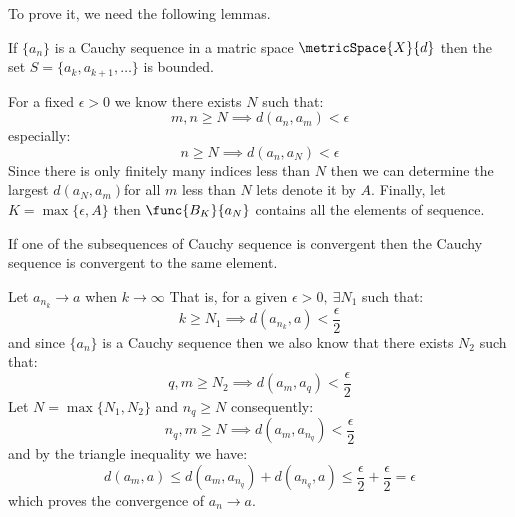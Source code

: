 To prove it, we need the following lemmas.

\begin{lemma} \label{Bounded}
    If \(\{ a_n \}\) is a Cauchy sequence in a matric space \(\metricSpace{X}{d}\) then the set \(S = \{ a_k , a_{k + 1}, \dots \}\) is bounded.
\end{lemma}

\begin{prooflemma}
    For a fixed \(\epsilon > 0\) we know there exists \(N\) such that:
    \[ m,n \geq N \implies d(a_n,a_m) < \epsilon\]
    especially:
    \[n \geq N \implies d(a_n,a_N) < \epsilon\]
    Since there is only finitely many indices less than \(N\) then we can determine the largest \(d(a_N, a_m)\)for all \(m\) less than \(N\) lets denote it by \(A\). Finally, let \(K = \max\{ \epsilon, A\}\) then \(\func{B_K}{a_N} \) contains all the elements of sequence.
\end{prooflemma}

\begin{lemma} \label{convergenceSubsequence}
    If one of the subsequences of Cauchy sequence is convergent then the Cauchy sequence is convergent to the same element.
\end{lemma}

\begin{prooflemma}
    Let \(a_{n_k} \to a \) when \(k \to \infty\) That is, for a given \(\epsilon > 0,\: \exists N_1\) such that:
    \[ k \geq N_1 \implies d(a_{n_k},a) < \frac{\epsilon}{2} \]
    and since \(\{ a_n \} \) is a Cauchy sequence then we also know that there exists \(N_2\) such that:
    \[ q,m \geq N_2 \implies d(a_m,a_q) < \frac{\epsilon}{2} \]
    Let \(N = \max\{ N_1, N_2\} \) and \(n_q \geq N\) consequently:
    \[ n_q,m \geq N \implies d(a_m,a_{n_q}) < \frac{\epsilon}{2} \]
    and by the triangle inequality we have:
    \[ d(a_m,a) \leq d(a_m, a_{n_q}) + d(a_{n_q},a) \leq \frac{\epsilon}{2} + \frac{\epsilon}{2} = \epsilon\]
    which proves the convergence of \(a_n \to a\).
\end{prooflemma}

